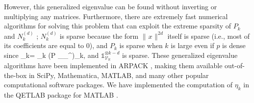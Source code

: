 \documentclass[11pt]{article}
\numberwithin{theorem}{section}
\theoremstyle{definition}
\newcommand{\tinyspace}{\mspace{1mu}}
\newcommand{\norm}[1]{\lVert\tinyspace #1 \tinyspace\rVert}
\newcommand{\I}{\mathds{1}}
\newcommand{\real}{\mathbb{R}}
\newcommand\V{\mathcal{V}}
\def\ba#1\ea{\begin{align}#1\end{align}}
\newcommand{\Vr}{\V_{\real}}
\begin{document}
However, this generalized eigenvalue can be found without inverting or multiplying any matrices. Furthermore, there are extremely fast numerical algorithms for solving this problem that can exploit the extreme sparsity of $P_k$ and $N_k^{(d)}$ \cite{Ste02,magron2023sparse}; $N_k^{(d)}$ is sparse because the form $\norm{x}^{2d}$ itself is sparse (i.e., most of its coefficients are equal to $0$), and $P_k$ is sparse when $k$ is large even if $p$ is dense since
\ba
P_k= \Pi_{k} (P \otimes \I_{\Vr}^{})\Pi_{k},
\ea
and $\I_{\Vr}^{\otimes k-d}$
is sparse. These generalized eigenvalue algorithms have been implemented in ARPACK \cite{arpack}, making them available out-of-the-box in SciPy, Mathematica, MATLAB, and many other popular computational software packages. We have implemented the computation of $\eta_k$ in the QETLAB package for MATLAB \cite{qetlab}.
\end{document}
